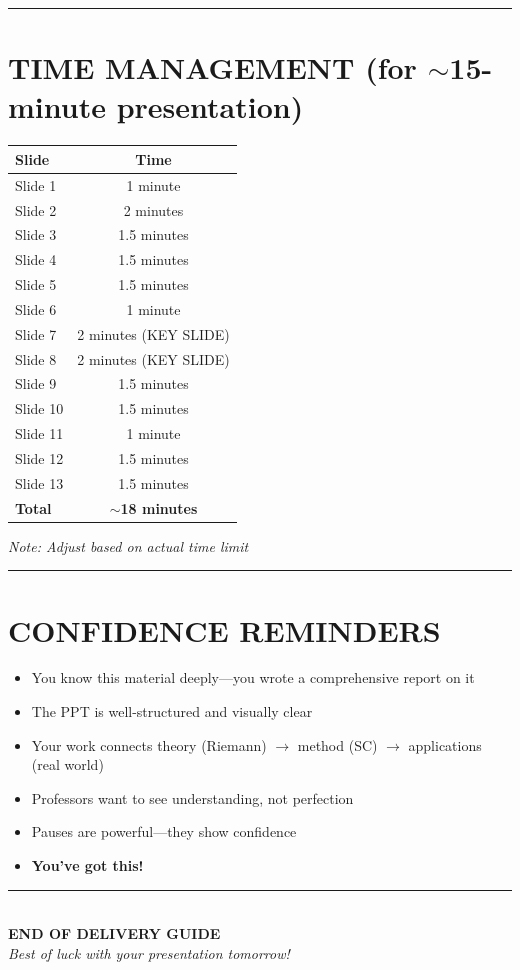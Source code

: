 \documentclass[12pt,a4paper]{article}
\begin{document}
\vspace{10pt}
\hrule
\vspace{10pt}

\section*{TIME MANAGEMENT (for $\sim$15-minute presentation)}

\begin{center}
\begin{tabular}{|l|c|}
\hline
\textbf{Slide} & \textbf{Time} \\
\hline
Slide 1 & 1 minute \\
Slide 2 & 2 minutes \\
Slide 3 & 1.5 minutes \\
Slide 4 & 1.5 minutes \\
Slide 5 & 1.5 minutes \\
Slide 6 & 1 minute \\
Slide 7 & 2 minutes (KEY SLIDE) \\
Slide 8 & 2 minutes (KEY SLIDE) \\
Slide 9 & 1.5 minutes \\
Slide 10 & 1.5 minutes \\
Slide 11 & 1 minute \\
Slide 12 & 1.5 minutes \\
Slide 13 & 1.5 minutes \\
\hline
\textbf{Total} & \textbf{$\sim$18 minutes} \\
\hline
\end{tabular}
\end{center}

\textit{Note: Adjust based on actual time limit}

\vspace{10pt}
\hrule
\vspace{10pt}

\section*{CONFIDENCE REMINDERS}

\begin{tipbox}
\begin{itemize}[leftmargin=*]
    \item[\checkmark] You know this material deeply---you wrote a comprehensive report on it
    \item[\checkmark] The PPT is well-structured and visually clear
    \item[\checkmark] Your work connects theory (Riemann) $\rightarrow$ method (SC) $\rightarrow$ applications (real world)
    \item[\checkmark] Professors want to see understanding, not perfection
    \item[\checkmark] Pauses are powerful---they show confidence
    \item[\checkmark] \textbf{You've got this!} \textbf{🎯}
\end{itemize}
\end{tipbox}

\vspace{20pt}
\begin{center}
\rule{0.8\textwidth}{0.4pt}\\[5pt]
\textbf{\Large END OF DELIVERY GUIDE}\\[5pt]
\textit{Best of luck with your presentation tomorrow!}
\end{center}
\end{document}
